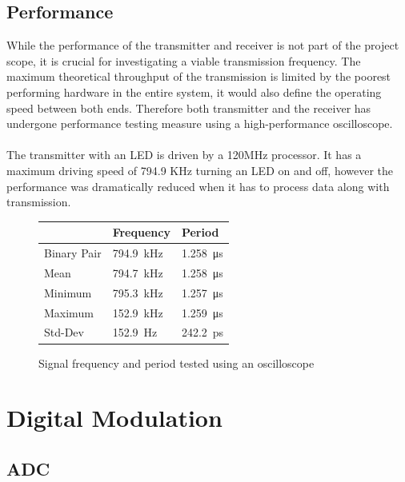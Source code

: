 \documentclass[letterpaper, 10 pt, conference]{ieeeconf}  %
\begin{document}
\subsection{Performance}

While the performance of the transmitter and receiver is not part of the project scope, it is crucial for investigating a viable transmission frequency. The maximum theoretical throughput of the transmission is limited by the poorest performing hardware in the entire system, it would also define the operating speed between both ends. Therefore both transmitter and the receiver has undergone performance testing measure using a high-performance oscilloscope. 
\\ \\
The transmitter with an LED is driven by a 120MHz processor. It has a maximum driving speed of 794.9 KHz turning an LED on and off, however the performance was dramatically reduced when it has to process data along with transmission. 

\begin{figure}[h!]
  \centering
  \begin{tabular}{lll} \toprule
   & Frequency & Period\\ \midrule
  Binary Pair & 794.9\SI{}{\kilo\hertz} & 1.258\SI{}{\micro\second} \\
  Mean & 794.7\SI{}{\kilo\hertz} & 1.258\SI{}{\micro\second} \\
  Minimum & 795.3\SI{}{\kilo\hertz} & 1.257\SI{}{\micro\second} \\
  Maximum & 152.9\SI{}{\kilo\hertz} & 1.259\SI{}{\micro\second} \\
  Std-Dev & 152.9\SI{}{\hertz} & 242.2\SI{}{\pico\second} \\ \bottomrule
  \end{tabular}
  \caption{Signal frequency and period tested using an oscilloscope}
\end{figure}

\section{Digital Modulation}
\subsection{ADC}
\end{document}
